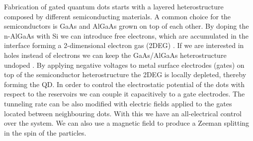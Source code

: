 Fabrication of gated quantum dots starts with a layered heterostructure composed by different semiconducting materials. A common choice for the semiconductors is GaAs and AlGaAs grown on top of each other. By doping the n-AlGaAs with Si we can introduce free electrons, which are accumulated in the interface forming a 2-dimensional electron gas (2DEG) \cite{Elzerman2005}. If we are interested in holes instead of electrons we can keep the GaAs/AlGaAs heterostructure undoped \cite{Tracy2014}. By applying negative voltages to metal surface electrodes (gates) on top of the semiconductor heterostructure the 2DEG is locally depleted, thereby forming the QD. In order to control the electrostatic potential of the dots with respect to the reservoirs we can couple it capacitively to a gate electrodes. The tunneling rate can be also modified with electric fields applied to the gates located between neighbouring dots. With this we have an all-electrical control over the system. We can also use a magnetic field to produce a Zeeman splitting in the spin of the particles.

